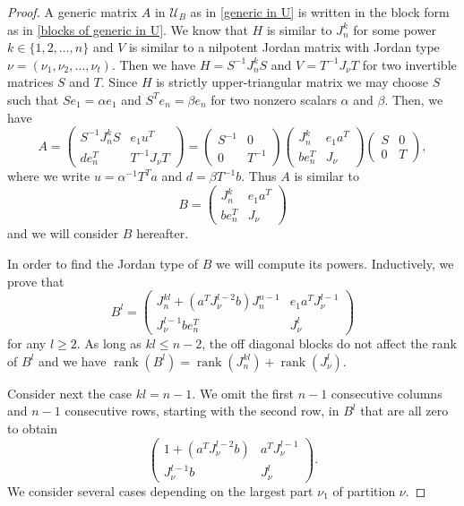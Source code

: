\documentclass[10pt,a4paper]{amsart}
\newcommand{\U}{\mathcal{U}}
\DeclareMathOperator{\rank}{rank}
\begin{document}
\begin{proof}
A generic matrix $A$ in $\U_B$ as in \eqref{generic in U} is written in the block form as in \eqref{blocks of generic in U}. We know that $H$ is similar to $J_n^k$ for some power $k\in\{1,2,\ldots,n\} $ and $V$ is similar to a nilpotent Jordan matrix with Jordan type $\nu=(\nu_1,\nu_2,\ldots,\nu_t)$. Then we have $H=S^{-1} J_n^k S $ and $V=T^{-1}J_{\nu}T $ for two invertible matrices $S$ and $T$. Since $H$ is strictly upper-triangular matrix we may choose $S$ such that $Se_1=\alpha e_1$ and $S^Te_n=\beta e_n$ for two nonzero scalars $\alpha$ and $\beta$. Then, we have
$$
A=\left( 
\begin{array}{c|c}
  S^{-1} J_n^kS   & e_1 u^T \\
  \hline
  d e_n^T   & T^{-1}J_{\nu}T
\end{array}
\right)=\left( 
\begin{array}{c|c}
  S^{-1}   & 0 \\
\hline
0   & T^{-1}
\end{array}
\right)\left( 
\begin{array}{c|c}
  J_n^k   & e_1 a^T \\
  \hline
  b e_n^T   & J_{\nu}
\end{array}
\right)\left( 
\begin{array}{c|c}
  S   & 0 \\
  \hline
  0   & T
\end{array}
\right),
$$
where we write $u=\alpha^{-1}T^Ta $ and $d=\beta T^{-1}b $.
Thus $A$ is similar to 
\[B=\left( 
\begin{array}{c|c}
  J_n^k   & e_1 a^T \\
  \hline
  b e_n^T   & J_{\nu}
\end{array}
\right)\]
and we will consider $B$ hereafter.

In order to find the Jordan type of $B$ we will compute its powers. Inductively, we prove that
$$
B^l=\left( 
\begin{array}{c|c}
  J_n^{kl} + \left(a^TJ_{\nu}^{l-2}b\right) J_n^{n-1}   & e_1 a^T J_{\nu}^{l-1} \\
  \hline
   J_{\nu}^{l-1} b e^T_n  & J_{\nu}^l
\end{array}
\right)
$$
for any $l\ge 2$. As long as $kl\leq n-2$, the off diagonal blocks do not affect the rank of $B^l$ and we have $\rank(B^l)=\rank(J_n^{kl})+\rank(J_{\nu}^l )$.

Consider next the case $kl=n-1$. We omit the first $n-1$ consecutive columns and $n-1$ consecutive rows, starting with the second row, in $B^l$ that are all zero to obtain
\begin{equation}
\label{kl=n-1}
\left( 
\begin{array}{c|c}
  1 + \left(a^TJ_{\nu}^{l-2}b\right)    & a^T J_{\nu}^{l-1} \\
  \hline
   J_{\nu}^{l-1} b   & J_{\nu}^l
\end{array}
\right).
\end{equation}
We consider several cases depending on the largest part $\nu_1$ of partition $\nu$. 


\end{proof}
\end{document}

